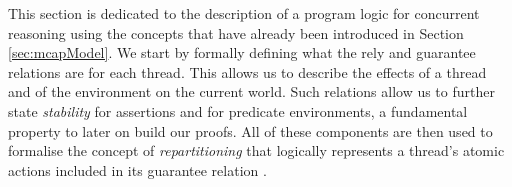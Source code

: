 \label{sec:mcapLogic}

This section is dedicated to the description of a program logic for concurrent reasoning using the concepts that have already been introduced in Section \ref{sec:mcapModel}. We start by formally defining what the rely and guarantee relations are for each thread. This allows us to describe the effects of a thread and of the environment on the current world. Such relations allow us to further state \textit{stability} for assertions and for predicate environments, a fundamental property to later on build our proofs. All of these components are then used to formalise the concept of \textit{repartitioning} that logically represents a thread's atomic actions included in its guarantee relation \cite{cap}\cite{colosl}.



\newpage



\newpage



\newpage



\newpage

